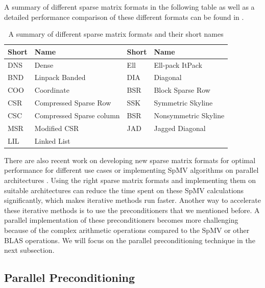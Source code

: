 A summary of different sparse matrix formats in the following table as well as a detailed performance comparison of these different formats can be found in \cite{stanimirovic2009performance}.
\begin{table}[h!]
\begin{tabular}{llll}
\toprule
Short & Name  & Short & Name            \\
\midrule
DNS        & Dense & Ell        & Ell-pack ItPack \\
BND           & Linpack Banded      &  DIA            & Diagonal                \\
COO           & Coordinate      & BSR           &  Block Sparse Row               \\
CSR           & Compressed Sparse Row      &    SSK        &    Symmetric Skyline             \\
CSC           &  Compressed Sparse column      & BSR           &  Nonsymmetric Skyline               \\
MSR           & Modified CSR       &    JAD        &    Jagged Diagonal             \\
    LIL       & Linked List      &            &                \\
\bottomrule
\end{tabular}
\caption{A summary of different sparse matrix formats and their short names}
\end{table}
There are also recent work on developing new sparse matrix formats for optimal performance for different use cases \cite{smailbegovic2005sparse,dongarraxz1994sparse} or implementing SpMV algorithms on parallel architectures \cite{bell2009,yan2014yaspmv,li2014performance}. Using the right sparse matrix formats and implementing them on suitable architectures can reduce the time spent on these SpMV calculations significantly, which makes iterative methods run faster. Another way to accelerate these iterative methods is to use the preconditioners that we mentioned before. A parallel implementation of these preconditioners becomes more challenging because of the complex arithmetic operations compared to the SpMV or other BLAS operations. We will focus on the parallel preconditioning technique in the next subsection.




\subsection{Parallel Preconditioning}

